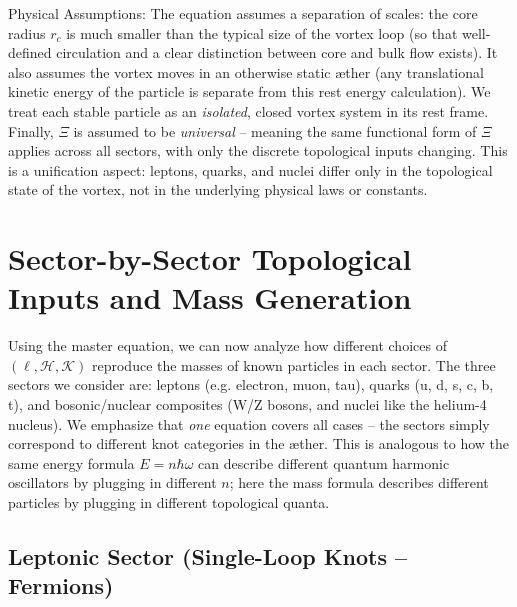 Physical Assumptions: The equation assumes a separation of scales: the core radius $r_c$ is much smaller than the typical size of the vortex loop (so that well-defined circulation and a clear distinction between core and bulk flow exists). It also assumes the vortex moves in an otherwise static æther (any translational kinetic energy of the particle is separate from this rest energy calculation). We treat each stable particle as an \textit{isolated}, closed vortex system in its rest frame. Finally, $\Xi$ is assumed to be \textit{universal} – meaning the same functional form of $\Xi$ applies across all sectors, with only the discrete topological inputs changing. This is a unification aspect: leptons, quarks, and nuclei differ only in the topological state of the vortex, not in the underlying physical laws or constants.\section*{Sector-by-Sector Topological Inputs and Mass Generation}

Using the master equation, we can now analyze how different choices of $(\ell,\mathcal{H},\mathcal{K})$ reproduce the masses of known particles in each sector. The three sectors we consider are: leptons (e.g. electron, muon, tau), quarks (u, d, s, c, b, t), and bosonic/nuclear composites (W/Z bosons, and nuclei like the helium-4 nucleus). We emphasize that \textit{one} equation covers all cases – the sectors simply correspond to different knot categories in the æther. This is analogous to how the same energy formula $E=n\hbar\omega$ can describe different quantum harmonic oscillators by plugging in different $n$; here the mass formula describes different particles by plugging in different topological quanta.\subsection*{Leptonic Sector (Single-Loop Knots – Fermions)}

